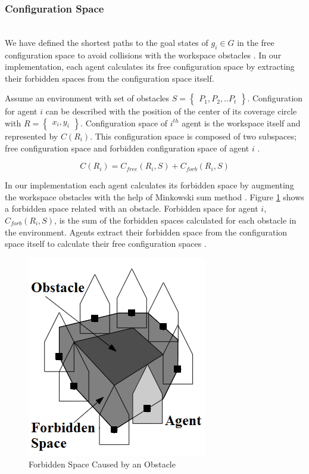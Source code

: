 \documentclass[letterpaper, 10 pt, conference]{ieeeconf}  %
\begin{document}
\subsubsection{Configuration Space}\hspace{0pt} \\
We have defined the shortest paths to the goal states of $g_i \in G$ in the free configuration space to avoid collisions with the workspace obstacles \cite{92}. In our implementation, each agent calculates its free configuration space by extracting their forbidden spaces from the configuration space itself.

Assume an environment with set of obstacles $S = \begin{Bmatrix}
P_1, P_2, .. P_t \end{Bmatrix}$. Configuration for agent $i$ can be described with the position of the center of its coverage circle with $R=\begin{Bmatrix}x_i, y_i\end{Bmatrix}$. Configuration space of $i^{th}$ agent is the workspace itself and represented by $C(R_i)$. This configuration space is composed of two subspaces; free configuration space and forbidden configuration space of agent $i$ \cite{92}.

\begin{equation}
C(R_i) = C_{free}(R_i,S) + C_{forb}(R_i,S)
\end{equation}

In our implementation each agent calculates its forbidden space by augmenting the workspace obstacles with the help of Minkowski sum method \cite{92}. Figure \ref{yasakli_bolge} shows a forbidden space related with an obstacle. Forbidden space for agent $i$, $C_{forb}(R_i, S)$, is the sum of the forbidden spaces calculated for each obstacle in the environment. Agents extract their forbidden space from the configuration space itself to calculate their free configuration spaces \cite{92}.


\begin{figure}[thpb]
     \centering
\includegraphics[scale = 0.45]{Forbidden}
  \caption{Forbidden Space Caused by an Obstacle \cite{92}} \label{yasakli_bolge}
\end{figure}
	
\end{document}
